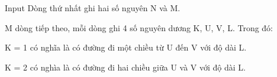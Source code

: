 Input
Dòng thứ nhất ghi hai số nguyên N và M.  

   M dòng tiếp theo, mỗi dòng ghi 4 số nguyên dương K, U, V, L. Trong đó:  

   K = 1 có nghĩa là có đường đi một chiều từ U đến V với độ dài L.  

   K = 2 có nghìa là có đường đi hai chiều giữa U và V với độ dài L.
